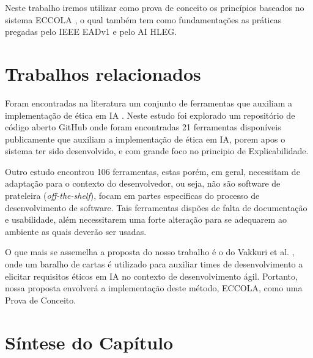Neste trabalho iremos utilizar como prova de conceito os princípios baseados no sistema ECCOLA \cite{ECCOLA}, o qual também tem como fundamentações as práticas pregadas pelo \acrshort{IEEE} \acrshort{EAD}v1 \cite{ieee2020EADv1} e pelo \acrshort{AI HLEG}\cite{HLEG_EthicsGuidelinesForTrustworthyAI}.


\section{Trabalhos relacionados}

Foram encontradas na literatura um conjunto de ferramentas que auxiliam a implementação de ética em IA \cite{siqueira2021ethical}. Neste estudo foi explorado um repositório de código aberto GitHub onde foram encontradas 21 ferramentas disponíveis publicamente que auxiliam a implementação de ética em IA, porem apos o sistema ter sido desenvolvido, e com grande foco no principio de Explicabilidade. 

Outro estudo \cite{morley2019initial} encontrou 106 ferramentas, estas porém, em geral, necessitam de adaptação para o contexto do desenvolvedor, ou seja, não são software de prateleira (\textit{off-the-shelf}), focam em partes especificas do processo de desenvolvimento de software. Tais ferramentas dispões de falta de documentação e usabilidade, além necessitarem uma forte alteração para se adequarem ao ambiente as quais deverão ser usadas.

O que mais se assemelha a proposta do nosso trabalho é o do Vakkuri et al. \cite{ECCOLA}, onde um baralho de cartas é utilizado para auxiliar times de desenvolvimento a elicitar requisitos éticos em IA no contexto de desenvolvimento ágil. Portanto, nossa proposta envolverá a implementação deste método, ECCOLA, como uma Prova de Conceito.

\section{Síntese do Capítulo}

